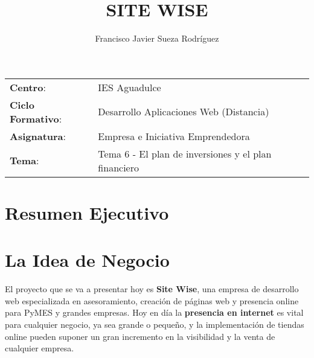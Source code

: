 


\title{
\vspace{10ex}
\normalfont \normalsize
\Huge  \textbf{SITE WISE}
}
\author{Francisco Javier Sueza Rodríguez}



\maketitle

\thispagestyle{empty}


\vspace{73ex}

\begin{center}
    \begin{tabular}{l l}
        \textbf{Centro}: & IES Aguadulce \\
        \textbf{Ciclo Formativo}: & Desarrollo Aplicaciones Web (Distancia)\\
        \textbf{Asignatura}: & Empresa e Iniciativa Emprendedora\\
        \textbf{Tema}: & Tema 6 - El plan de inversiones y el plan financiero\\
    \end{tabular}
\end{center}

\newpage

\tableofcontents

\newpage

\section{Resumen Ejecutivo}


\section{La Idea de Negocio}
El proyecto que se va a presentar hoy es \textbf{Site Wise}, una empresa de desarrollo web especializada en asesoramiento, creación de páginas web y presencia online para PyMES y grandes empresas. Hoy en día la \textbf{presencia en internet} es vital para cualquier negocio, ya sea grande o pequeño, y la implementación de tiendas online pueden suponer un gran incremento en la visibilidad y la venta de cualquier empresa.


